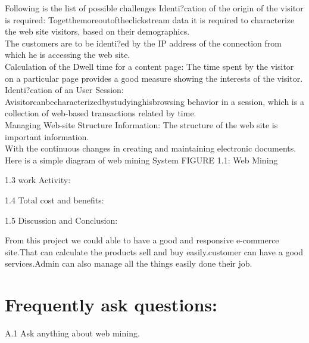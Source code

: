 \documentclass[a4paper,10pt]{article}
\begin{document}
\newpage
\begin{center}
	Following is the list of possible challenges Identi?cation of the origin of the visitor is required: Togetthemoreoutoftheclickstream data it is required to characterize the web site visitors, based on their demographics.\\ The customers are to be identi?ed by the IP address of the connection from which he is accessing the web site.\\\vspace{0.5cm} Calculation of the Dwell time for a content page: The time spent by the visitor on a particular page provides a good measure showing the interests of the visitor.\\ Identi?cation of an User Session: Avisitorcanbecharacterizedbystudyinghisbrowsing behavior in a session, which is a collection of web-based transactions related by time.\\ Managing Web-site Structure Information: The structure of the web site is important information.\\ With the\vspace{0.5cm} continuous changes in creating and maintaining electronic documents.\\
	Here is a simple diagram of web mining System
	FIGURE 1.1: Web Mining
\end{center}
\newpage
\item[1.3] work Activity:
\vspace{3.00cm}
\item[1.4] Total cost and benefits:
\vspace{3.00cm}
\item[1.5] Discussion and Conclusion:
\begin{center}
	From this project we could able to have a good and responsive e-commerce site.That can calculate the products sell and buy easily.customer can have a good services.Admin can also manage all the things easily done their job.
\end{center}
\newpage
\section{Frequently ask questions:}
\item[A.1] Ask anything about web mining.

    
\end{document}
